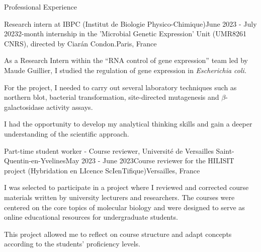 \documentclass[
	10pt,
]{style} %
\begin{document}

\begin{rSection}{Professional Experience}

	\begin{rSubsection}{Research intern at IBPC (Institut de Biologie Physico-Chimique)}{June 2023 - July 2023}{2-month internship in the 'Microbial Genetic Expression' Unit (UMR8261 CNRS), directed by Ciarán Condon.}{Paris, France}
		\item As a Research Intern within the ``RNA control of gene expression'' team led by Maude Guillier, I studied the regulation of gene expression in \textit{Escherichia coli.}
		\item For the project, I needed to carry out several laboratory techniques such as northern blot, bacterial transformation, site-directed mutagenesis and $\beta$-galactosidase activity assays.
		\item I had the opportunity to develop my analytical thinking skills and gain a deeper understanding of the scientific approach.
	\end{rSubsection}


	\begin{rSubsection}{Part-time student worker - Course reviewer, Université de Versailles Saint-Quentin-en-Yvelines}{May 2023 - June 2023}{Course reviewer for the HILISIT project (Hybridation en LIcence ScIenTifique)}{Versailles, France}
		\item I was selected to participate in a project where I reviewed and corrected course materials written by university lecturers and researchers. The courses were centered on the core topics of molecular biology and were designed to serve as online educational resources for undergraduate students.
		\item This project allowed me to reflect on course structure and adapt concepts according to the students' proficiency levels.
	\end{rSubsection}

\end{rSection}

\end{document}
